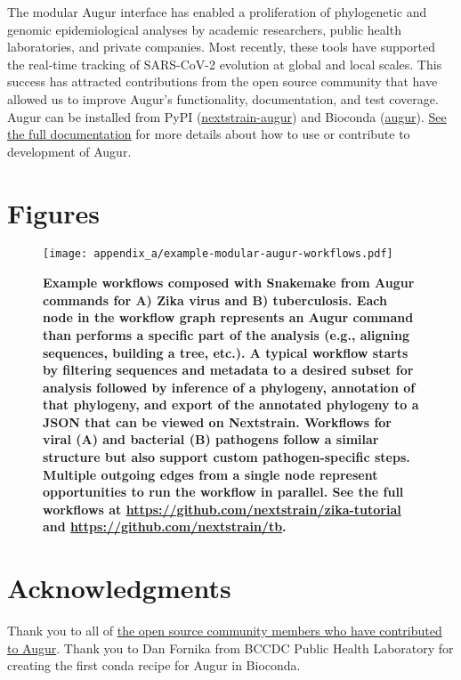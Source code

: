 The modular Augur interface has enabled a proliferation of phylogenetic and genomic epidemiological analyses by academic researchers, public health laboratories, and private companies.
Most recently, these tools have supported the real-time tracking of SARS-CoV-2 evolution at global and local scales.
This success has attracted contributions from the open source community that have allowed us to improve Augur's functionality, documentation, and test coverage.
Augur can be installed from PyPI (\href{https://pypi.org/project/nextstrain-augur/}{nextstrain-augur}) and Bioconda (\href{https://bioconda.github.io/recipes/augur/README.html}{augur}).
\href{http://docs.nextstrain.org/}{See the full documentation} for more details about how to use or contribute to development of Augur.

\section{Figures}

\begin{figure}
  \centering
  \texttt{[image: appendix\_a/example-modular-augur-workflows.pdf]}
  \caption[Example workflows composed with Snakemake from Augur commands for Zika virus and tuberculosis.]{\label{fig:example-workflows}\bf{Example workflows composed with Snakemake from Augur commands for A) Zika virus and B) tuberculosis.}
    Each node in the workflow graph represents an Augur command than performs a specific part of the analysis (e.g., aligning sequences, building a tree, etc.).
    A typical workflow starts by filtering sequences and metadata to a desired subset for analysis followed by inference of a phylogeny, annotation of that phylogeny, and export of the annotated phylogeny to a JSON that can be viewed on Nextstrain.
    Workflows for viral (A) and bacterial (B) pathogens follow a similar structure but also support custom pathogen-specific steps.
    Multiple outgoing edges from a single node represent opportunities to run the workflow in parallel.
    See the full workflows at \url{https://github.com/nextstrain/zika-tutorial} and \url{https://github.com/nextstrain/tb}.}
\end{figure}

\section{Acknowledgments}

Thank you to all of \href{https://github.com/nextstrain/augur/graphs/contributors}{the open source community members who have contributed to Augur}.
Thank you to Dan Fornika from BCCDC Public Health Laboratory for creating the first conda recipe for Augur in Bioconda.
